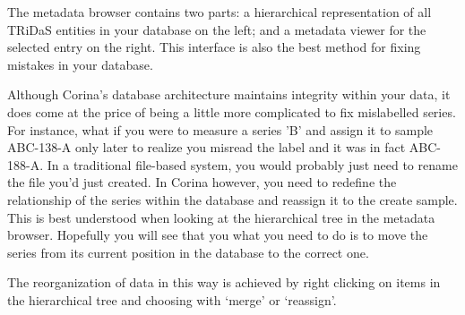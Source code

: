 The metadata browser contains two parts: a hierarchical representation of all TRiDaS entities in your database on the left; and a metadata viewer for the selected entry on the right.  This interface is also the best method for fixing mistakes in your database.  

Although Corina's database architecture maintains integrity within your data, it does come at the price of being a little more complicated to fix mislabelled series.  For instance, what if you were to measure a series 'B' and assign it to sample ABC-138-A only later to realize you misread the label and it was in fact ABC-188-A.  In a traditional file-based system, you would probably just need to rename the file you'd just created.  In Corina however, you need to redefine the relationship of the series within the database and reassign it to the create sample.  This is best understood when looking at the hierarchical tree in the metadata browser.  Hopefully you will see that you what you need to do is to move the series from its current position in the database to the correct one.  

The reorganization of data in this way is achieved by right clicking on items in the hierarchical tree and choosing with `merge' or `reassign'.



